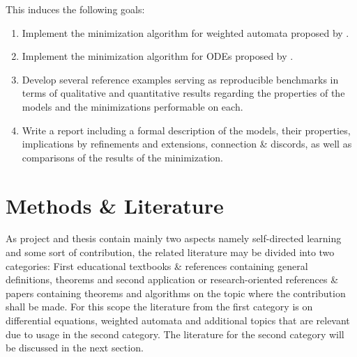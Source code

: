 \documentclass[11pt, rgb]{scrartcl}
\begin{document}
This induces the following goals:
\begin{enumerate}
 \item Implement the minimization algorithm for weighted automata proposed by \autocite{Kiefer2013OnTC}.
 \item Implement the minimization algorithm for ODEs proposed by \autocite{Cardelli2017MaximalAO}.
 \item Develop several reference examples serving as reproducible benchmarks in terms of qualitative and quantitative results regarding the properties of the models and the minimizations performable on each.
 \item Write a report including a formal description of the models, their properties, implications by refinements and extensions, connection \& discords, as well as comparisons of the results of the minimization.
\end{enumerate}



\section{Methods \& Literature}
As project and thesis contain mainly two aspects namely self-directed learning and some sort of contribution, the related literature may be divided into two categories: First educational textbooks \& references containing general definitions, theorems and second application or research-oriented references \& papers containing theorems and algorithms on the topic where the contribution shall be made. 
For this scope the literature from the first category is on differential equations, weighted automata and additional topics that are relevant due to usage in the second category. 
The literature for the second category will be discussed in the next section. 
\end{document}
